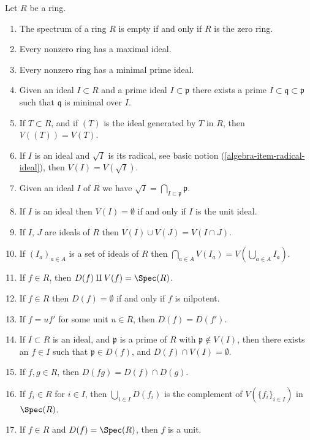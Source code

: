 \begin{lemma}
\label{editorial-source-lemma-Zariski-topology}
Let $R$ be a ring.
\begin{enumerate}
\item The spectrum of a ring $R$ is empty if and only if $R$
is the zero ring.
\item Every nonzero ring has a maximal ideal.
\item Every nonzero ring has a minimal prime ideal.
\item Given an ideal $I \subset R$ and a prime ideal
$I \subset \mathfrak p$ there exists a prime
$I \subset \mathfrak q \subset \mathfrak p$ such
that $\mathfrak q$ is minimal over $I$.
\item If $T \subset R$, and if $(T)$ is the ideal generated by
$T$ in $R$, then $V((T)) = V(T)$.
\item If $I$ is an ideal and $\sqrt{I}$ is its radical,
see basic notion (\ref{algebra-item-radical-ideal}), then $V(I) = V(\sqrt{I})$.
\item Given an ideal $I$ of $R$ we have $\sqrt{I} =
\bigcap_{I \subset \mathfrak p} \mathfrak p$.
\item If $I$ is an ideal then $V(I) = \emptyset$ if and only
if $I$ is the unit ideal.
\item If $I$, $J$ are ideals of $R$ then $V(I) \cup V(J) =
V(I \cap J)$.
\item If $(I_a)_{a\in A}$ is a set of ideals of $R$ then
$\bigcap_{a\in A} V(I_a) = V(\bigcup_{a\in A} I_a)$.
\item If $f \in R$, then $D(f) \amalg V(f) = \Spec(R)$.
\item If $f \in R$ then $D(f) = \emptyset$ if and only if $f$
is nilpotent.
\item If $f = u f'$ for some unit $u \in R$, then $D(f) = D(f')$.
\item If $I \subset R$ is an ideal, and $\mathfrak p$ is a prime of
$R$ with $\mathfrak p \not\in V(I)$, then there exists an $f \in I$
such that $\mathfrak p \in D(f)$, and $D(f) \cap V(I) = \emptyset$.
\item If $f, g \in R$, then $D(fg) = D(f) \cap D(g)$.
\item If $f_i \in R$ for $i \in I$, then
$\bigcup_{i\in I} D(f_i)$ is the complement of $V(\{f_i \}_{i\in I})$
in $\Spec(R)$.
\item If $f \in R$ and $D(f) = \Spec(R)$, then $f$ is a unit.
\end{enumerate}
\end{lemma}

